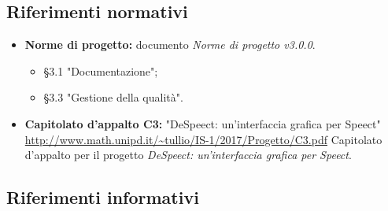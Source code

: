\documentclass[openany,12pt,a4paper]{report}
\begin{document}
    \subsection*{Riferimenti normativi}
    
    \begin{itemize}
    
        \item \textbf{Norme di progetto:} documento \textit{Norme di progetto v3.0.0}.
	        \begin{itemize}
	        	\item §3.1 "Documentazione";
	        	\item §3.3 "Gestione della qualità".
	        \end{itemize}
        
        \item\textbf{Capitolato d'appalto C3:} "DeSpeect: un'interfaccia grafica per Speect" \\ \url{http://www.math.unipd.it/~tullio/IS-1/2017/Progetto/C3.pdf}
        	\subitem Capitolato d'appalto per il progetto \textit{DeSpeect: un'interfaccia grafica per Speect}.
    
    \end{itemize}
    
    \subsection*{Riferimenti informativi}
    
\end{document}
